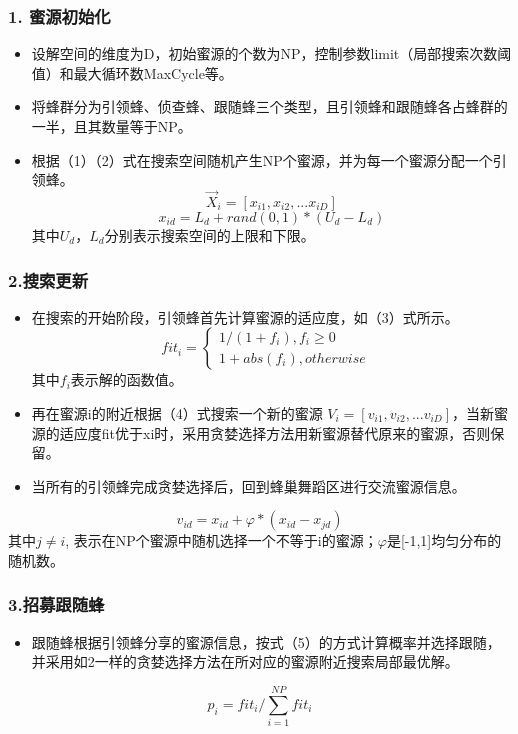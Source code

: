 \begin{frame}
	\frametitle{1. 蜜源初始化}
	\begin{itemize}
		\item { 设解空间的维度为D，初始蜜源的个数为NP，控制参数limit（局部搜索次数阈值）和最大循环数MaxCycle等。}
		\item { 将蜂群分为引领蜂、侦查蜂、跟随蜂三个类型，且引领蜂和跟随蜂各占蜂群的一半，且其数量等于NP。}
		\item { 根据（1）（2）式在搜索空间随机产生NP个蜜源，并为每一个蜜源分配一个引领蜂。 }
			\begin{equation}
				\vec{X}_{i} = [x_{i1}, x_{i2}, ... x_{iD}]   
			\end{equation}
			\begin{equation}
				x_{id} = L_{d} + rand(0,1) * (U_{d} - L_{d}) 
			\end{equation}
			其中$U_{d}$，$L_{d}$分别表示搜索空间的上限和下限。
	\end{itemize}
\end{frame}

\begin{frame}
	\frametitle{2.搜索更新}
	\begin{itemize}
		\item { 在搜索的开始阶段，引领蜂首先计算蜜源的适应度，如（3）式所示。}
			\begin{equation}
				fit_{i} = \left\{  
             		\begin{array}{lr}  
             		1 / (1 + f_{i}),f_{i} \geq 0 &  \\  
             		1 + abs(f_{i}), otherwise    
             	\end{array}  
           		\right.    
			\end{equation}
			其中$f_{i}$表示解的函数值。
		\item { 再在蜜源i的附近根据（4）式搜索一个新的蜜源 $ V_{i} = [v_{i1},v_{i2},... v_{iD}] $，当新蜜源的适应度fit优于xi时，采用贪婪选择方法用新蜜源替代原来的蜜源，否则保留。}
		\item { 当所有的引领蜂完成贪婪选择后，回到蜂巢舞蹈区进行交流蜜源信息。} 
	\end{itemize}
	\begin{equation}
		v_{id} = x_{id} + \varphi * (x_{id} - x_{jd})    
	\end{equation}
	\qquad 其中$ j \neq i $, 表示在NP个蜜源中随机选择一个不等于i的蜜源；$ \varphi $是[-1,1]均匀分布的随机数。
\end{frame}

\begin{frame}
	\frametitle{3.招募跟随蜂}
	\begin{itemize}
		\item {跟随蜂根据引领蜂分享的蜜源信息，按式（5）的方式计算概率并选择跟随，并采用如2一样的贪婪选择方法在所对应的蜜源附近搜索局部最优解。}
	\end{itemize}
	\begin{equation}
	p_{i} = fit_{i} / \sum_{i=1}^{NP} fit_{i}
	\end{equation}
\end{frame}

